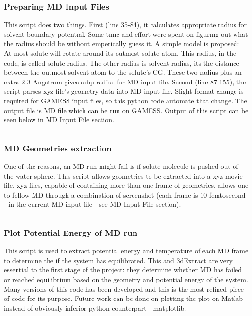 \documentclass[
journal=jacsat, %
manuscript=article]{achemso}
\begin{document}
		\subsubsection{Preparing MD Input Files}
			This script does two things. First (line 35-84), it calculates appropriate radius for solvent boundary potential. Some time and effort were spent on figuring out what the radius should be without emperically guess it. A simple model is proposed: At most solute will rotate around its outmost solute atom. This radius, in the code, is called solute radius. The other radius is solvent radius, its the distance between the outmost solvent atom to the solute's CG. These two radius plus an extra 2-3 Angstrom gives ssbp radius for MD input file. Second (line 87-155), the script parses xyz file's geometry data into MD input file. Slight format change is required for GAMESS input files, so this python code automate that change. The output file is MD file which can be run on GAMESS. Output of this script can be seen below in MD Input File section.
			\vfill
			\inputminted[linenos, breaklines, baselinestretch=1, fontsize=\small]{python}{../pythonScripts/prepareMD2.py}
		
		\subsubsection{MD Geometries extraction}
			One of the reasons, an MD run might fail is if solute molecule is pushed out of the water sphere. This script allows geometries to be extracted into a xyz-movie file. xyz files, capable of containing more than one frame of geometries, allows one to follow MD through a combination of screenshot (each frame is 10 femtosecond - in the current MD input file - see MD Input File section). 
			\inputminted[linenos, breaklines, baselinestretch=1, fontsize=\small]{python}{../pythonScripts/3dExtract4.py}
			
		\subsubsection{Plot Potential Energy of MD run}
			This script is used to extract potential energy and temperature of each MD frame to determine the if the system has equilibrated. This and 3dExtract are very essential to the first stage of the project: they determine whether MD has failed or reached equilibrium based on the geometry and potential energy of the system. Many versions of this code has been developed and this is the most refined piece of code for its purpose. Future work can be done on plotting the plot on Matlab instead of obviously inferior python counterpart - matplotlib. 
			\inputminted[linenos, breaklines, baselinestretch=1, fontsize=\small]{python}{../pythonScripts/plotEnergyMD6.py} 	
		
\end{document}
